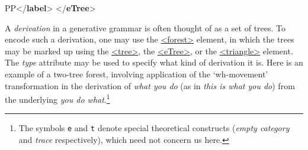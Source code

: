 \begin{shaded}
\hspace*{1em}\hspace*{1em}\mbox{}\newline 
\hspace*{1em}\mbox{}\newline 
\hspace*{1em}\mbox{}\newline 
\hspace*{1em}\hspace*{1em}PP{</\textbf{label}>}\mbox{}\newline 
\hspace*{1em}\mbox{}\newline 
{}\mbox{}\newline 
{</\textbf{eTree}>}\end{shaded}\egroup\par \par
A \textit{derivation} in a generative grammar is often thought of as a set of trees. To encode such a derivation, one may use the \hyperref[TEI.forest]{<forest>} element, in which the trees may be marked up using the \hyperref[TEI.tree]{<tree>}, the \hyperref[TEI.eTree]{<eTree>}, or the \hyperref[TEI.triangle]{<triangle>} element. The {\itshape type} attribute may be used to specify what kind of derivation it is. Here is an example of a two-tree forest, involving application of the ‘wh-movement’ transformation in the derivation of \textit{what you do} (as in \textit{this is what you do}) from the underlying \textit{you do what}.\footnote{The symbols \texttt{e} and \texttt{t} denote special theoretical constructs (\textit{empty category} and \textit{trace} respectively), which need not concern us here.}\par
